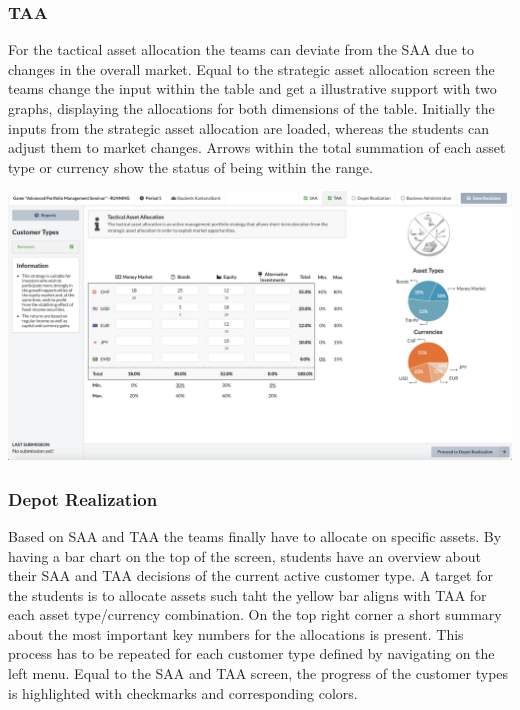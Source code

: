 \subsubsection{TAA}
For the tactical asset allocation the teams can deviate from the SAA due to changes in the overall market. Equal to the strategic asset allocation screen the teams change the input within the table and get a illustrative support with two graphs, displaying the allocations for both dimensions of the table. Initially the inputs from the strategic asset allocation are loaded, whereas the students can adjust them to market changes. Arrows within the total summation of each asset type or currency show the status of being within the range.
\begin{center}
  \includegraphics[scale=0.2]{img/application-overview/teams/04_taa.png}
\end{center}

\subsubsection{Depot Realization}
Based on SAA and TAA the teams finally have to allocate on specific assets. By having a bar chart on the top of the screen, students have an overview about their SAA and TAA decisions of the current active customer type. A target for the students is to allocate assets such taht the yellow bar aligns with TAA for each asset type/currency combination. On the top right corner a short summary about the most important key numbers for the allocations is present.
This process has to be repeated for each customer type defined by navigating on the left menu. Equal to the SAA and TAA screen, the progress of the customer types is highlighted with checkmarks and corresponding colors.

